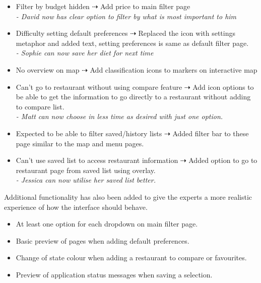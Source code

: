 \documentclass[a4 paper, 12pt]{article}
\begin{document}
    \begin{itemize}
        \item Filter by budget hidden $\dashrightarrow$ Add price to main filter page \\
        \textit{- David now has clear option to filter by what is most important to him}
        \item Difficulty setting default preferences $\dashrightarrow$ Replaced the icon with settings metaphor and added text, setting preferences is same as default filter page. \\
        \textit{- Sophie can now save her diet for next time}
        \item No overview on map  $\dashrightarrow$ Add classification icons to markers on interactive map            
        \item Can't go to restaurant without using compare feature $\dashrightarrow$ Add icon options to be able to get the information to go directly to a restaurant without adding to compare list. \\
        \textit{- Matt can now choose in less time as desired with just one option.}
        \item Expected to be able to filter saved/history lists $\dashrightarrow$ Added filter bar to these page similar to the map and menu pages. 
        \item Can't use saved list to access restaurant information $\dashrightarrow$ Added option to go to restaurant page from saved list using overlay.  \\
        \textit{- Jessica can now utilise her saved list better.}
    \end{itemize}



    Additional functionality has also been added to give the experts a more realistic experience of how the interface should behave.
    \begin{itemize}
        \item At least one option for each dropdown on main filter page.
        \item Basic preview of pages when adding default preferences.
        \item Change of state colour when adding a restaurant to compare or favourites.
        \item Preview of application status messages when saving a selection.
    \end{itemize}
\end{document}
